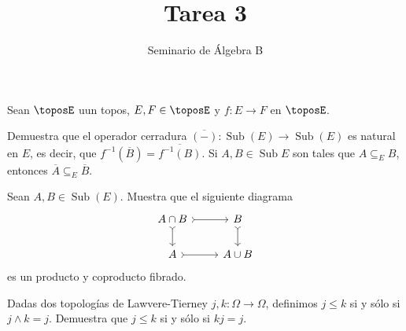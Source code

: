 \documentclass[article]{memoir}
\title{Tarea 3}
\author{Seminario de Álgebra B}
\date{}
\DeclareMathOperator{\sub}{Sub}
\begin{document}
\maketitle

\begin{exercise}
  Sean \(\toposE\) uun topos, \(E,F\in\toposE\) y \(f\colon E\to F\) en \(\toposE\).
  \begin{tasks}
    \task Demuestra que el operador cerradura \(\overline{(-)}\colon\sub(E)\to\sub(E)\) es natural en \(E\), es decir, que \(f^{-1}(\overline{B})=\overline{f^{-1}(B)}\).
    \task Si \(A,B\in\sub{E}\) son tales que \(A\subseteq_E B\), entonces \(\overline{A}\subseteq_E \overline{B}\). 
  \end{tasks}
\end{exercise}

\begin{exercise}
  Sean \(A,B\in\sub(E)\). Muestra que el siguiente diagrama
  \[
    \begin{tikzcd}[arrows=tail, ampersand replacement=\&]
      A\cap B\ar{r}\ar{d} \& B\ar{d}\\
      A\ar{r} \& A\cup B
    \end{tikzcd}
  \]
  es un producto y coproducto fibrado.
\end{exercise}

\begin{exercise}
  Dadas dos topologías de Lawvere-Tierney \(j,k\colon\Omega\to\Omega\), definimos \(j\leq k\) si y sólo si 
  \(j\land k=j\). Demuestra que \(j\leq k\) si y sólo si \(kj=j\).
\end{exercise}
\end{document}
